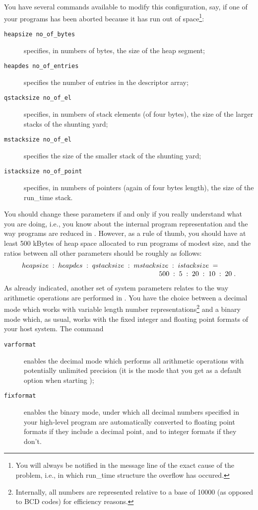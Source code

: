 You have several commands available to modify this configuration, say,
if one of your programs has been aborted because it has run
 out of space\footnote{You will always be notified in the message line
of the exact cause of the problem, i.e., in which run\_time structure the
overflow has occured.}: 
\begin{description}
\item[{\tt heapsize no\_of\_bytes}] specifies, in numbers of bytes,
the size of the heap segment; 
\item[{\tt heapdes no\_of\_entries}] specifies the number of entries in
the descriptor array;
\item[{\tt qstacksize no\_of\_el}] specifies, in numbers of stack elements
(of four bytes), the size of the larger stacks of the shunting yard;
\item[{\tt mstacksize no\_of\_el}] specifies the size of the smaller stack
of the shunting yard;
\item[{\tt istacksize no\_of\_point}] specifies, in numbers of pointers
(again of four bytes length), the size of the run\_time stack.
\end{description}
You should change these parameters if and only if you really understand
what you are doing, i.e., you know about the internal program representation
and the way programs are reduced in \pired. However, as a rule of thumb,
you should have at least 500 kBytes of heap space allocated to run 
programs of modest size, and the ratios between all other
parameters should be roughly as follows:
$$
\begin{array}{l}
heapsize\;:\;heapdes\;:\;qstacksize\;:\;mstacksize\;:\;istacksize\;=
\phantom{xxxx}
\\ \multicolumn{1}{r}{500\;:\;5\;:\;20\;:\;10\;:\;20\;.}
\end{array}
$$
As already indicated, another set of {\mys system parameters} relates to
the way {\mys arithmetic operations} are performed in \pired. You have the
choice between a {\mys decimal mode} which works with variable length
number representations\footnote{Internally, all numbers
are represented relative to a base of 10000 (as opposed to
 BCD codes) for efficiency reasons.} and a {\mys binary mode} which,
 as usual, works with the fixed integer and floating point formats of
 your host system. The command
\begin{description}
\item[{\tt varformat}] enables the decimal mode which performs all arithmetic
operations with potentially unlimited {\mys precision} (it is the mode that
you get as a default option when starting \pired);
\item[{\tt fixformat}] enables the binary mode, under which all decimal
numbers specified in your high-level \kir program are automatically 
converted to floating point formats if they include a decimal point, 
and to integer formats if they don't.
\end{description}
